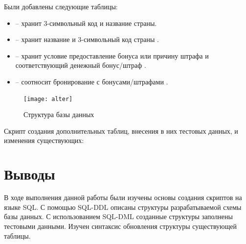 Были добавлены следующие таблицы:
\begin{itemize}
	\item {} -- хранит 3-символьный код  и название  страны.
	
	\item {} -- хранит название  и 3-символьный код страны .
	
	\item {} -- хранит условие предоставление бонуса или причину штрафа  и соответствующий денежный бонус/штраф .
	
	\item {} -- соотносит бронирование  с бонусами/штрафами .
\end{itemize}

\begin{figure}[H]
	\centering
	\texttt{[image: alter]}
	\caption{Структура базы данных}
\end{figure}

Скрипт создания дополнительных таблиц, внесения в них тестовых данных, и изменения существующих:



\section{Выводы}

В ходе выполнения данной работы были изучены основы создания скриптов на языке SQL. С помощью SQL-DDL описаны структуры разрабатываемой схемы базы данных. С использованием SQL-DML созданные структуры заполнены тестовыми данными. Изучен синтаксис обновления структуры существующей таблицы.


